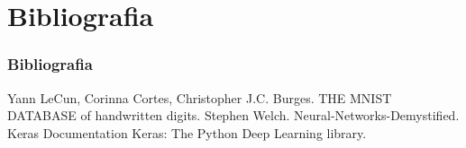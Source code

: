 \documentclass{beamer}
\begin{document}
\section{Bibliografia}
\begin{frame}[allowframebreaks]

 \frametitle{Bibliografia}
 \begin{thebibliography}{10}
 \beamertemplatearticlebibitems
 Yann LeCun, Corinna Cortes, Christopher J.C. Burges.
 \newblock THE MNIST DATABASE of handwritten digits.
 \beamertemplatearticlebibitems
   Stephen Welch.
   \newblock Neural-Networks-Demystified.
   \beamertemplatearticlebibitems
   Keras Documentation
   \newblock Keras: The Python Deep Learning library.
 
 \end{thebibliography}
 \end{frame}
\end{document}
